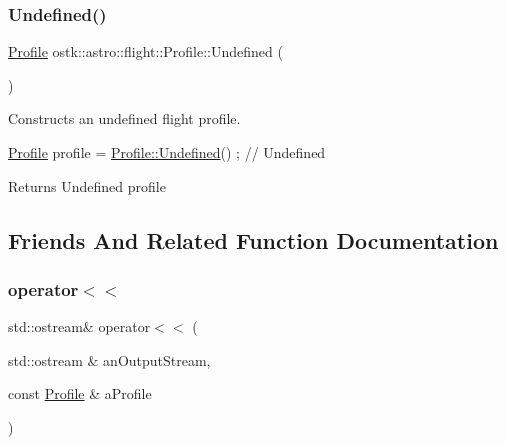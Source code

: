 \subsubsection{\texorpdfstring{Undefined()}{Undefined()}}
{\footnotesize\ttfamily \hyperlink{classostk_1_1astro_1_1flight_1_1_profile}{Profile} ostk\+::astro\+::flight\+::\+Profile\+::\+Undefined (\begin{DoxyParamCaption}{ }\end{DoxyParamCaption})\hspace{0.3cm}{\ttfamily [static]}}



Constructs an undefined flight profile. 


\begin{DoxyCode}
\hyperlink{classostk_1_1astro_1_1flight_1_1_profile_a80fbc6a3773a6f2790b84c4ddb306d07}{Profile} profile = \hyperlink{classostk_1_1astro_1_1flight_1_1_profile_aa966c10872c2d193d43c358b25f64289}{Profile::Undefined}() ; \textcolor{comment}{// Undefined}
\end{DoxyCode}


\begin{DoxyReturn}{Returns}
Undefined profile 
\end{DoxyReturn}


\subsection{Friends And Related Function Documentation}
\mbox{\label{classostk_1_1astro_1_1flight_1_1_profile_a8747e69fc10f1b068a0dd02d79da3b95}} 
\subsubsection{\texorpdfstring{operator$<$$<$}{operator<<}}
{\footnotesize\ttfamily std\+::ostream\& operator$<$$<$ (\begin{DoxyParamCaption}\item[{std\+::ostream \&}]{an\+Output\+Stream,  }\item[{const \hyperlink{classostk_1_1astro_1_1flight_1_1_profile}{Profile} \&}]{a\+Profile }\end{DoxyParamCaption})\hspace{0.3cm}{\ttfamily [friend]}}



